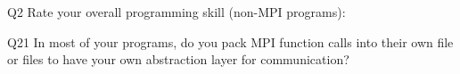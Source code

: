 \begin{description}%
\item{Q2} Rate your overall programming skill (non-MPI programs):%
\item{Q21} In most of your programs, do you pack MPI function calls into their own file or files to have your own abstraction layer for communication?%
\end{description}%
